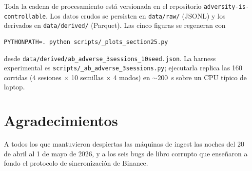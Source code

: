 \documentclass[journal,onecolumn,11pt]{IEEEtran}
\begin{document}
Toda la cadena de procesamiento está versionada en el repositorio
\texttt{adversity-is-controllable}. Los datos crudos se persisten en
\texttt{data/raw/} (JSONL) y los derivados en \texttt{data/derived/}
(Parquet). Las cinco figuras se regeneran con
\begin{verbatim}
PYTHONPATH=. python scripts/_plots_section25.py
\end{verbatim}
desde \texttt{data/derived/ab\_adverse\_3sessions\_10seed.json}.
La harness experimental es
\texttt{scripts/\_ab\_adverse\_3sessions.py}; ejecutarla replica las
160 corridas (4 sesiones $\times$ 10 semillas $\times$ 4 modos) en
$\sim\!200$~s sobre un CPU típico de laptop.

\section*{Agradecimientos}

A todos los que mantuvieron despiertas las máquinas de ingest las
noches del 20 de abril al 1 de mayo de 2026, y a los seis bugs de
libro corrupto que enseñaron a fondo el protocolo de sincronización
de Binance.
\end{document}
